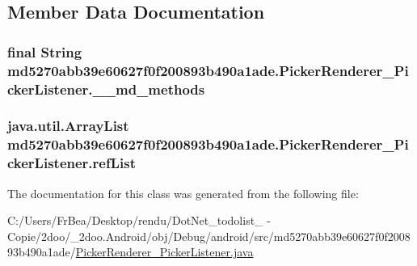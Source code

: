 \subsection{Member Data Documentation}
\hypertarget{classmd5270abb39e60627f0f200893b490a1ade_1_1_picker_renderer___picker_listener_0364241ced938474af94b5858f99e10d}{
\subsubsection[{\_\-\_\-md\_\-methods}]{\setlength{\rightskip}{0pt plus 5cm}final String {\bf md5270abb39e60627f0f200893b490a1ade.PickerRenderer\_\-PickerListener.\_\-\_\-md\_\-methods}}}
\label{classmd5270abb39e60627f0f200893b490a1ade_1_1_picker_renderer___picker_listener_0364241ced938474af94b5858f99e10d}


\hypertarget{classmd5270abb39e60627f0f200893b490a1ade_1_1_picker_renderer___picker_listener_b8b564f9c49032cb1d7d689a8ca19e1a}{
\subsubsection[{refList}]{\setlength{\rightskip}{0pt plus 5cm}java.util.ArrayList {\bf md5270abb39e60627f0f200893b490a1ade.PickerRenderer\_\-PickerListener.refList}}}
\label{classmd5270abb39e60627f0f200893b490a1ade_1_1_picker_renderer___picker_listener_b8b564f9c49032cb1d7d689a8ca19e1a}




The documentation for this class was generated from the following file:\begin{CompactItemize}
\item 
C:/Users/FrBea/Desktop/rendu/DotNet\_\-todolist\_ - Copie/2doo/\_\-2doo.Android/obj/Debug/android/src/md5270abb39e60627f0f200893b490a1ade/\hyperlink{md5270abb39e60627f0f200893b490a1ade_2_picker_renderer___picker_listener_8java}{PickerRenderer\_\-PickerListener.java}\end{CompactItemize}
